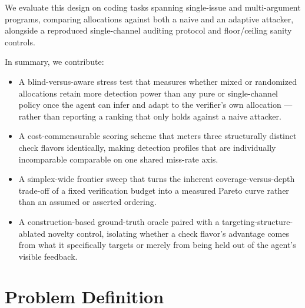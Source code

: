 \documentclass[11pt]{article}
\begin{document}
We evaluate this design on coding tasks spanning single-issue and multi-argument programs, comparing allocations against both a naive and an adaptive attacker, alongside a reproduced single-channel auditing protocol and floor/ceiling sanity controls.

In summary, we contribute:
\begin{itemize}[leftmargin=1.4em]
\item A blind-versus-aware stress test that measures whether mixed or randomized allocations retain more detection power than any pure or single-channel policy once the agent can infer and adapt to the verifier's own allocation --- rather than reporting a ranking that only holds against a naive attacker.
\item A cost-commensurable scoring scheme that meters three structurally distinct check flavors identically, making detection profiles that are individually incomparable comparable on one shared miss-rate axis.
\item A simplex-wide frontier sweep that turns the inherent coverage-versus-depth trade-off of a fixed verification budget into a measured Pareto curve rather than an assumed or asserted ordering.
\item A construction-based ground-truth oracle paired with a targeting-structure-ablated novelty control, isolating whether a check flavor's advantage comes from what it specifically targets or merely from being held out of the agent's visible feedback.
\end{itemize}

\section{Problem Definition}
\end{document}
